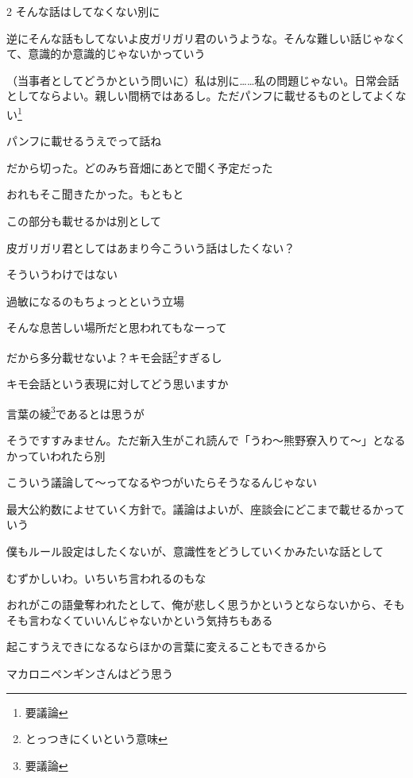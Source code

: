 \begin{multicols}{2}
 そんな話はしてなくない別に

 逆にそんな話もしてないよ皮ガリガリ君のいうような。そんな難しい話じゃなくて、意識的か意識的じゃないかっていう

 （当事者としてどうかという問いに）私は別に……私の問題じゃない。日常会話としてならよい。親しい間柄ではあるし。ただパンフに載せるものとしてよくない\footnote{要議論}

 パンフに載せるうえでって話ね

 だから切った。どのみち音畑にあとで聞く予定だった

 おれもそこ聞きたかった。もともと

 この部分も載せるかは別として

 皮ガリガリ君としてはあまり今こういう話はしたくない？

 そういうわけではない

 過敏になるのもちょっとという立場

 そんな息苦しい場所だと思われてもなーって

 だから多分載せないよ？キモ会話\footnote{とっつきにくいという意味}すぎるし

 キモ会話という表現に対してどう思いますか

 言葉の綾\footnote{要議論}であるとは思うが

 そうですすみません。ただ新入生がこれ読んで「うわ～熊野寮入りて～」となるかっていわれたら別

 こういう議論して～ってなるやつがいたらそうなるんじゃない

 最大公約数によせていく方針で。議論はよいが、座談会にどこまで載せるかっていう

 僕もルール設定はしたくないが、意識性をどうしていくかみたいな話として

 むずかしいわ。いちいち言われるのもな

 おれがこの語彙奪われたとして、俺が悲しく思うかというとならないから、そもそも言わなくていいんじゃないかという気持ちもある

 起こすうえできになるならほかの言葉に変えることもできるから

 マカロニペンギンさんはどう思う


\end{multicols}

